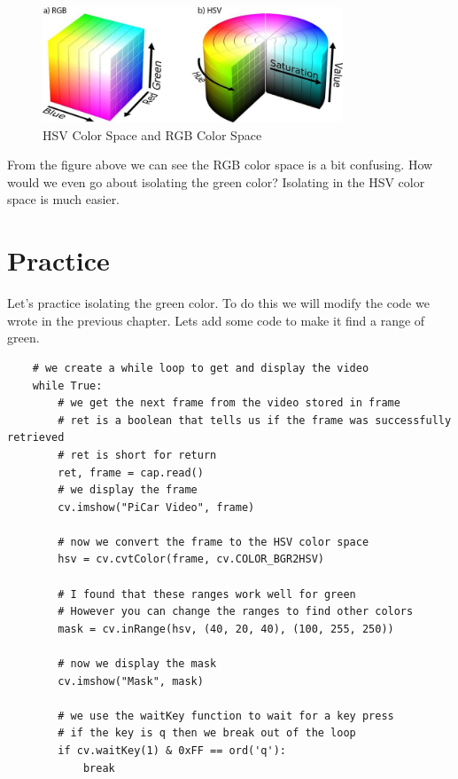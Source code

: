 \documentclass[11pt]{report}
\begin{document}
\begin{figure}[htbp]
    \centering
    \includegraphics[width=0.8\textwidth]{HSVVSRGB.jpeg}
    \caption{HSV Color Space and RGB Color Space}
    \label{fig:HSVVSRGB}
\end{figure}

From the figure above we can see the RGB color space is a bit confusing. How would we even go about isolating the green color? Isolating in the HSV color space is much easier.

\section{Practice}
Let's practice isolating the green color. To do this we will modify the code we wrote in the previous chapter. Lets add some code to make it find a range of green.

\begin{verbatim}
    # we create a while loop to get and display the video
    while True:
        # we get the next frame from the video stored in frame
        # ret is a boolean that tells us if the frame was successfully retrieved
        # ret is short for return
        ret, frame = cap.read()
        # we display the frame
        cv.imshow("PiCar Video", frame)

        # now we convert the frame to the HSV color space
        hsv = cv.cvtColor(frame, cv.COLOR_BGR2HSV)

        # I found that these ranges work well for green
        # However you can change the ranges to find other colors
        mask = cv.inRange(hsv, (40, 20, 40), (100, 255, 250))

        # now we display the mask
        cv.imshow("Mask", mask)

        # we use the waitKey function to wait for a key press
        # if the key is q then we break out of the loop
        if cv.waitKey(1) & 0xFF == ord('q'):
            break

\end{verbatim}
\end{document}
